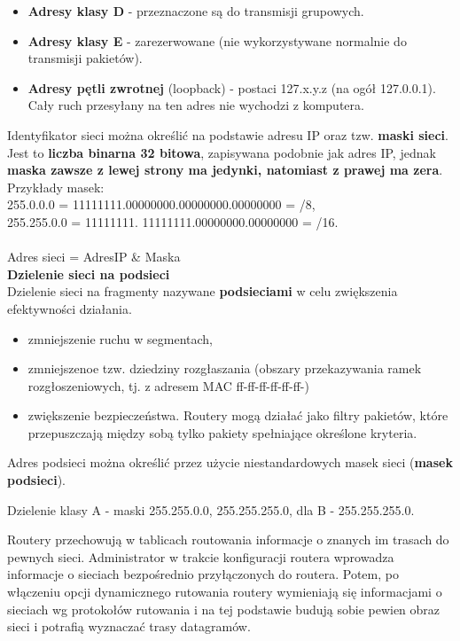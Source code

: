 \documentclass[a4paper]{article}
\begin{document}
\begin{itemize}
\item \textbf{Adresy klasy D} - przeznaczone są do transmisji grupowych.
\item \textbf{Adresy klasy E} - zarezerwowane (nie wykorzystywane normalnie do transmisji pakietów).
\item \textbf{Adresy pętli zwrotnej} (loopback) - postaci 127.x.y.z (na ogół 127.0.0.1). Cały ruch przesyłany na ten adres nie wychodzi z komputera.
\end{itemize}

Identyfikator sieci można określić na podstawie adresu IP oraz tzw. \textbf{maski sieci}. Jest to \textbf{liczba binarna 32 bitowa}, zapisywana podobnie jak adres IP, jednak \textbf{maska zawsze z lewej strony ma jedynki, natomiast z prawej ma zera}.\\
Przykłady masek:\\
255.0.0.0 = 11111111.00000000.00000000.00000000 = /8,\\
255.255.0.0 = 11111111. 11111111.00000000.00000000 = /16.\\
\\
Adres sieci = AdresIP \& Maska\\


\textbf{Dzielenie sieci na podsieci}\\
Dzielenie sieci na fragmenty nazywane \textbf{podsieciami} w celu zwiększenia efektywności działania.
\begin{itemize}
    \item zmniejszenie ruchu w segmentach,
    \item zmniejszenoe tzw. dziedziny rozgłaszania (obszary przekazywania ramek rozgłoszeniowych,
    tj. z adresem MAC ff-ff-ff-ff-ff-ff-)
    \item zwiększenie bezpieczeństwa. Routery mogą działać jako filtry pakietów, które
    przepuszczają między sobą tylko pakiety spełniające określone kryteria.
\end{itemize}
Adres podsieci można określić przez użycie niestandardowych masek sieci (\textbf{masek podsieci}).

Dzielenie klasy A - maski 255.255.0.0, 255.255.255.0, dla B - 255.255.255.0.

Routery przechowują w tablicach routowania informacje o znanych im trasach do pewnych sieci. Administrator w trakcie konfiguracji routera wprowadza informacje o sieciach bezpośrednio przyłączonych do routera. Potem, po włączeniu opcji dynamicznego rutowania
routery wymieniają się informacjami o sieciach wg protokołów rutowania i na tej podstawie budują sobie pewien obraz
sieci i potrafią wyznaczać trasy datagramów.
\end{document}
